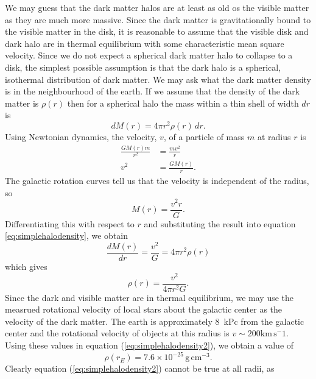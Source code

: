 We may guess that the dark matter halos are at least as old os the visible
matter as they are much more massive. Since the dark matter is gravitationally
bound to the visible matter in the disk, it is reasonable to assume that the
visible disk and dark halo are in thermal equilibrium with some characteristic
mean square velocity. Since we do not expect a spherical dark matter halo to
collapse to a disk, the simplest possible assumption is that the dark halo is
a spherical, isothermal distribution of dark matter. We may ask what the
dark matter density is in the neighbourhood of the earth. If we assume that
the density of the dark matter is $\rho(r)$ then for a spherical halo the mass
within a thin shell of width $dr$ is
\begin{equation}
dM(r) = 4\pi r^2 \rho(r)\, dr.
\label{eq:simplehalodensity}
\end{equation}
Using Newtonian dynamics, the velocity, $v$, of a particle of mass $m$ at
radius $r$ is
\begin{equation}
\begin{split}
\frac{GM(r)m}{r^2} &= \frac{mv^2}{r} \\
v^2 &= \frac{GM(r)}{r}.
\end{split}
\end{equation}
The galactic rotation curves tell us that the velocity is independent of the
radius, so
\begin{equation}
M(r) = \frac{v^2r}{G}.
\end{equation}
Differentiating this with respect to $r$ and substituting the result into
equation \ref{eq:simplehalodensity}, we obtain
\begin{equation}
\frac{dM(r)}{dr} = \frac{v^2}{G} = 4\pi r^2\rho(r)
\end{equation}
which gives
\begin{equation}
\rho(r) = \frac{v^2}{4\pi r^2 G}.
\label{eq:simplehalodensity2}
\end{equation}
Since the dark and visible matter are in thermal equilibrium, we may use the
measrued rotational velocity of local stars about the galactic center as the
velocity of the dark matter. The earth is approximately $8$~kPc from the
galactic center and the rotational velocity of objects at this radius is
$v\sim 200\mathrm{km\,s}^-1$. Using these values in equation
(\ref{eq:simplehalodensity2}), we obtain a value of
\begin{equation}
\rho(r_E) = 7.6 \times 10^{-25}\, \mathrm{g}\,\mathrm{cm}^{-3}.
\end{equation}
Clearly equation (\ref{eq:simplehalodensity2}) cannot be true at all radii, as
